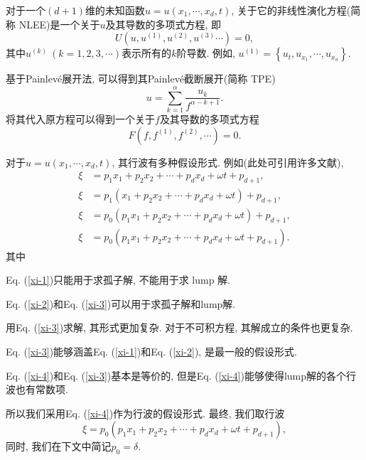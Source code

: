 \documentclass[12pt,a4paper,UTF8]{article}
\numberwithin{equation}{section}
\newcommand{\sbrace}[1]{\left(#1\right)}
\newcommand{\bbrace}[1]{\left\{#1\right\}}
\newcommand{\up}[1]{^{(#1)}}
\newcommand{\Painleve}{Painlev{\'e}}
\newcommand{\refeqn}[1]{Eq. (\ref{#1})}
\begin{document}
对于一个$(d+1)$维的未知函数$u=u(x_1,\cdots,x_d,t)$, 关于它的非线性演化方程(简称 NLEE)是一个关于$u$及其导数的多项式方程, 即
\begin{equation}
    U(u,u\up{1},u\up{2},u\up{3}\cdots)=0, \label{oeq}
\end{equation}
其中$u\up{k}~(k=1,2,3,\cdots)$表示所有的$k$阶导数. 例如, $u\up{1}=\bbrace{u_t,u_{x_1},\cdots,u_{x_n}}$.

基于\Painleve{}展开法, 可以得到其\Painleve{}截断展开(简称 TPE)
\begin{equation}
u=\sum_{k=1}^{\alpha}{\frac{u_k}{f^{\alpha-k+1}}}. 
\end{equation}
将其代入原方程可以得到一个关于$f$及其导数的多项式方程 
\begin{equation}
F\sbrace{f,f\up{1},f\up{2},\cdots}=0.
\end{equation}

对于$u=u\sbrace{x_1,\cdots,x_d,t}$, 其行波有多种假设形式. 例如(此处可引用许多文献), 
\begin{subequations}
\begin{align}
\xi&=p_1 x_1 + p_2 x_2 + \cdots + p_d x_d + \omega t+p_{d+1},  \label{xi-1}\\ 
\xi&=p_1 (x_1 + p_2 x_2 + \cdots + p_d x_d + \omega t)+p_{d+1}, \label{xi-2}\\ 
\xi&=p_0 \sbrace{p_1 x_1 + p_2 x_2 + \cdots + p_d x_d + \omega t}+p_{d+1}, \label{xi-3}\\
\xi&=p_0 \sbrace{p_1 x_1 + p_2 x_2 + \cdots + p_d x_d + \omega t+p_{d+1}}. \label{xi-4} 
\end{align}
\end{subequations}
其中
\begin{compactitem}[\textbullet]
\item \refeqn{xi-1}只能用于求孤子解, 不能用于求 lump 解.
\item \refeqn{xi-2}和\refeqn{xi-3}可以用于求孤子解和lump解. 
\item 用\refeqn{xi-3}求解, 其形式更加复杂. 对于不可积方程, 其解成立的条件也更复杂.
\item \refeqn{xi-3}能够涵盖\refeqn{xi-1}和\refeqn{xi-2}, 是最一般的假设形式.
\item \refeqn{xi-4}和\refeqn{xi-3}基本是等价的, 但是\refeqn{xi-4}能够使得lump解的各个行波也有常数项.
\end{compactitem}
所以我们采用\refeqn{xi-4}作为行波的假设形式. 最终, 我们取行波
\begin{equation}
  \xi=p_0 \sbrace{p_1 x_1 + p_2 x_2 + \cdots + p_d x_d + \omega t+p_{d+1}}, 
  \label{xi}
\end{equation}
同时, 我们在下文中简记$p_0=\delta$. 
\end{document}
